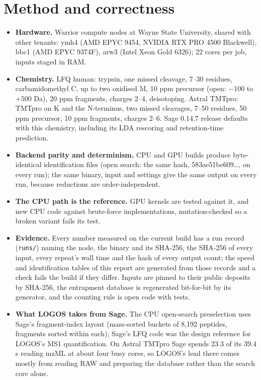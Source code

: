 \documentclass[10pt,a4paper]{article}
\begin{document}
\section{Method and correctness}
\begin{itemize}
\item \textbf{Hardware.} Warrior compute nodes at Wayne State University, shared with other tenants: ymh4 (AMD EPYC 9454, NVIDIA RTX PRO 4500 Blackwell), bbc1 (AMD EPYC 9374F), arw3 (Intel Xeon Gold 6326); 22 cores per job, inputs staged in RAM.
\item \textbf{Chemistry.} LFQ human: trypsin, one missed cleavage, 7--30 residues, carbamidomethyl C, up to two oxidised M, 10 ppm precursor (open: $-100$ to $+500$ Da), 20 ppm fragments, charges 2--4, deisotoping. Astral TMTpro: TMTpro on K and the N-terminus, two missed cleavages, 7--50 residues, 50 ppm precursor, 10 ppm fragments, charges 2--6. Sage 0.14.7 release defaults with this chemistry, including its LDA rescoring and retention-time prediction.
\item \textbf{Backend parity and determinism.} CPU and GPU builds produce byte-identical identification files (open search: the same hash, 583ae51be609\dots, on every run); the same binary, input and settings give the same output on every run, because reductions are order-independent.
\item \textbf{The CPU path is the reference.} GPU kernels are tested against it, and new CPU code against brute-force implementations, mutation-checked so a broken variant fails its test.
\item \textbf{Evidence.} Every number measured on the current build has a run record (\texttt{runs/}) naming the node, the binary and its SHA-256, the SHA-256 of every input, every repeat's wall time and the hash of every output count; the speed and identification tables of this report are generated from those records and a check fails the build if they differ. Inputs are pinned to their public deposits by SHA-256, the entrapment database is regenerated bit-for-bit by its generator, and the counting rule is open code with tests.
\item \textbf{What LOGOS takes from Sage.} The CPU open-search preselection uses Sage's fragment-index layout (mass-sorted buckets of 8,192 peptides, fragments sorted within each); Sage's LFQ code was the design reference for LOGOS's MS1 quantification. On Astral TMTpro Sage spends 23.3 of its 39.4 s reading mzML at about four busy cores, so LOGOS's lead there comes mostly from reading RAW and preparing the database rather than the search core alone.
\end{itemize}
\end{document}
